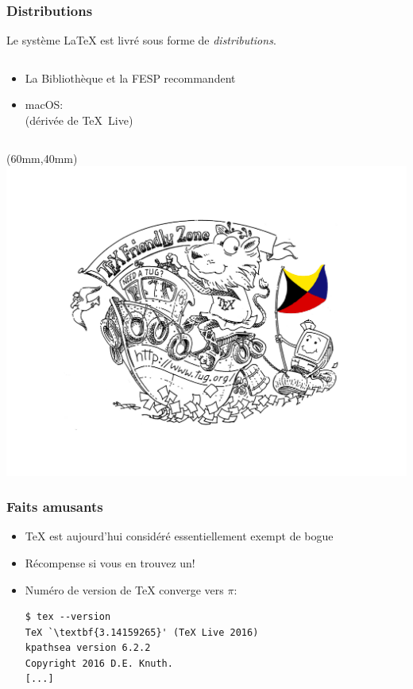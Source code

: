 \begin{frame}
  \frametitle{Distributions}

  Le système {\LaTeX} est livré sous forme de \emph{distributions}.

  \begin{columns}
    \begin{column}{.58\textwidth}
      \begin{itemize}
      \item La Bibliothèque et la FESP recommandent %
      \item macOS: %
         \\ %
        (dérivée de {\TeX}~Live)
      \end{itemize}
    \end{column}
    \begin{column}{.42\textwidth}
    \end{column}
  \end{columns}
  \begin{textblock*}{70mm}(60mm,40mm)
    \includegraphics[width=\linewidth]{TeXFZoneColor}
  \end{textblock*}
\end{frame}

\begin{frame}[fragile=singleslide]
  \frametitle{Faits amusants}
  \begin{itemize}
  \item {\TeX} est aujourd'hui considéré essentiellement exempt de bogue
  \item Récompense si vous en trouvez un!
  \item Numéro de version de {\TeX} converge vers $\pi$:
\begin{lstlisting}
$ tex --version
TeX `\textbf{3.14159265}' (TeX Live 2016)
kpathsea version 6.2.2
Copyright 2016 D.E. Knuth.
[...]
\end{lstlisting} %
  \end{itemize}
\end{frame}

